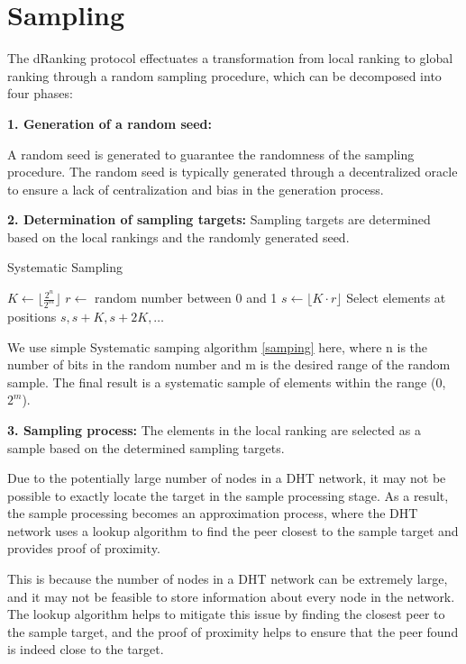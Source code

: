 \documentclass[twocolumn]{article}
\begin{document}
\section{Sampling}

The dRanking protocol effectuates a transformation from local ranking to global ranking through a random sampling procedure, which can be decomposed into four phases:

\textbf{1. Generation of a random seed:}

A random seed is generated to guarantee the randomness of the sampling procedure. The random seed is typically generated through a decentralized oracle to ensure a lack of centralization and bias in the generation process.

\textbf{2. Determination of sampling targets:} Sampling targets are determined based on the local rankings and the randomly generated seed.

\begin{algorithm}[htbp]
  \caption{Systematic Sampling}
  \label{samping}
\begin{algorithmic}[1]
\State $K \gets \lfloor \frac{2^n}{2^m} \rfloor$
\State $r \gets$ random number between 0 and 1
\State $s \gets \lfloor K \cdot r \rfloor$
\State Select elements at positions $s, s + K, s + 2K, \dots$
\end{algorithmic}
\end{algorithm}


We use simple Systematic samping algorithm \ref{samping} here, where n is the number of bits in the random number and m is the desired range of the random sample. The final result is a systematic sample of elements within the range (0, $2^m$).

\textbf{3. Sampling process:} The elements in the local ranking are selected as a sample based on the determined sampling targets.

Due to the potentially large number of nodes in a DHT\cite{Chord} network, it may not be possible to exactly locate the target in the sample processing stage. As a result, the sample processing becomes an approximation process, where the DHT network uses a lookup algorithm to find the peer closest to the sample target and provides proof of proximity.

This is because the number of nodes in a DHT network can be extremely large, and it may not be feasible to store information about every node in the network. The lookup algorithm helps to mitigate this issue by finding the closest peer to the sample target, and the proof of proximity helps to ensure that the peer found is indeed close to the target.
\end{document}
